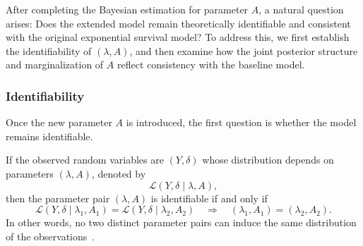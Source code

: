 After completing the Bayesian estimation for parameter $A$, a natural question arises: 
Does the extended model remain theoretically identifiable and consistent with the original exponential survival model? 
To address this, we first establish the identifiability of $(\lambda, A)$, and then examine how the joint posterior structure and marginalization of $A$ reflect consistency with the baseline model. 

\subsubsection{Identifiability}
Once the new parameter $A$ is introduced, the first question is whether the model remains identifiable. 
\begin{definition}
If the observed random variables are $(Y, \delta)$ whose distribution depends on parameters $(\lambda, A)$, denoted by~\cite{maclaren2020estimatedidentifiabilityestimabilitycausal}
\begin{equation}
    \mathcal{L}(Y,\delta \mid \lambda,A),
\end{equation}
then the parameter pair $(\lambda, A)$ is identifiable if and only if
\begin{equation}
    \mathcal{L}(Y,\delta \mid \lambda_1,A_1) = \mathcal{L}(Y,\delta \mid \lambda_2,A_2)
\quad \Rightarrow \quad (\lambda_1,A_1) = (\lambda_2,A_2).
\end{equation}
In other words, no two distinct parameter pairs can induce the same distribution of the observations~\cite{henao2011sparse, maclaren2020estimatedidentifiabilityestimabilitycausal}.
\end{definition}
